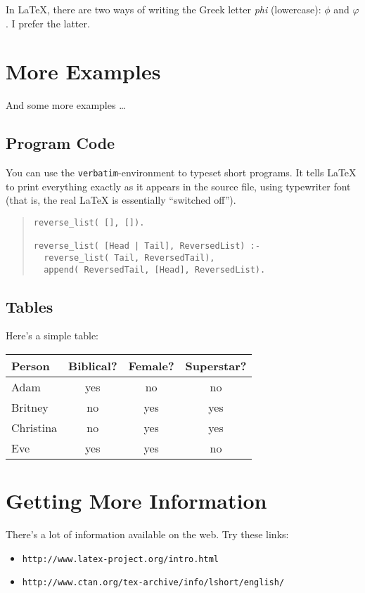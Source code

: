 \documentclass[11pt]{article}
\begin{document}
In LaTeX, there are two ways of writing the Greek letter \emph{phi}
(lowercase): $\phi$ and $\varphi$. I prefer the latter.


\section{More Examples}

And some more examples \ldots

\subsection{Program Code}

You can use the \texttt{verbatim}-environment to typeset short programs. It 
tells LaTeX to print everything exactly as it appears in the source file, using 
typewriter font (that is, the real LaTeX is essentially ``switched off'').
\begin{quote} %
\begin{verbatim}
reverse_list( [], []).

reverse_list( [Head | Tail], ReversedList) :-
  reverse_list( Tail, ReversedTail),
  append( ReversedTail, [Head], ReversedList).
\end{verbatim}
\end{quote}

\subsection{Tables}

Here's a simple table:
\begin{center}
\begin{tabular}{|l||c|c|c|}
\hline
Person & Biblical? & Female? & Superstar? \\
\hline\hline
Adam      & yes & no  & no  \\
Britney   & no  & yes & yes \\
Christina & no  & yes & yes \\
Eve       & yes & yes & no  \\
\hline
\end{tabular}
\end{center}


\section{Getting More Information}

There's a lot of information available on the web. 
Try these links:
\begin{itemize}
\item \texttt{http://www.latex-project.org/intro.html}
\item \texttt{http://www.ctan.org/tex-archive/info/lshort/english/}
\end{itemize}
\end{document}
